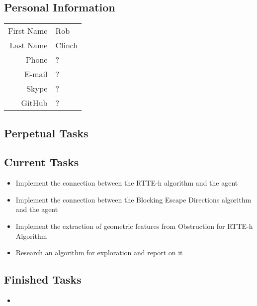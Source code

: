 \subsection{Personal Information}
\begin{table}[h!]
	\begin{tabular}{rl}
	First Name 	& Rob\\
	Last Name	& Clinch\\
	Phone		& ?\\
	E-mail		& ?\\
	Skype		& ?\\
	GitHub		& ?
\end{tabular}
\end{table}

\subsection{Perpetual Tasks}

\subsection{Current Tasks}
\begin{itemize}
	\item Implement the connection between the RTTE-h algorithm and the agent
	\item Implement the connection between the Blocking Escape Directions algorithm and the agent
	\item Implement the extraction of geometric features from Obstruction for RTTE-h Algorithm
	\item Research an algorithm for exploration and report on it
\end{itemize}

\subsection{Finished Tasks}
\begin{itemize}
\item
\end{itemize}